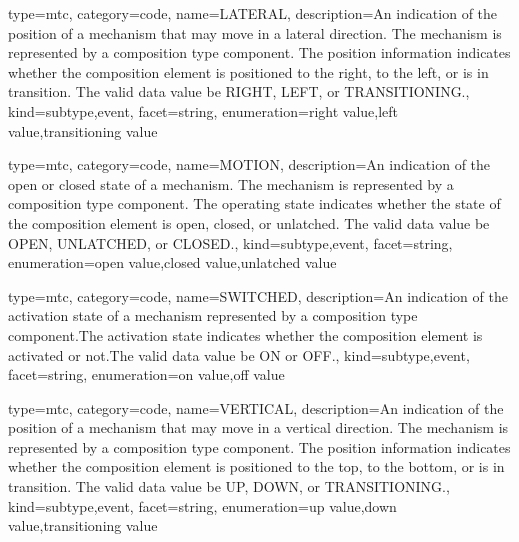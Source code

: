 {
  type=mtc,
  category=code,
  name={LATERAL},
  description={An indication of the position of a mechanism that may move in a lateral direction.   The mechanism is represented by a \gls{composition} type component. \newline The position information indicates whether the \gls{composition} element is positioned to the right, to the left, or is in transition.  \newline The \gls{valid data value} \must be RIGHT, LEFT, or TRANSITIONING.},
  kind={subtype,event},
  facet={\gls{string}},
  enumeration={\gls{right value},\gls{left value},\gls{transitioning value}}
}


{
  type=mtc,
  category=code,
  name={MOTION},
  description={An indication of the open or closed state of a mechanism.   The mechanism is represented by a \gls{composition} type component. \newline The operating state indicates whether the state of the \gls{composition} element is open, closed, or unlatched.   \newline The \gls{valid data value} \must be OPEN, UNLATCHED, or CLOSED.},
  kind={subtype,event},
  facet={\gls{string}},
  enumeration={\gls{open value},\gls{closed value},\gls{unlatched value}}
}


{
  type=mtc,
  category=code,
  name={SWITCHED},
  description={An indication of the activation state of a mechanism represented by a \gls{composition} type component.The activation state indicates whether the \gls{composition} element is activated or not.The \gls{valid data value} \must be ON or OFF.},
  kind={subtype,event},
  facet={\gls{string}},
  enumeration={\gls{on value},\gls{off value}}
}


{
  type=mtc,
  category=code,
  name={VERTICAL},
  description={An indication of the position of a mechanism that may move in a vertical direction. The mechanism is represented by a \gls{composition} type component. \newline The position information indicates whether the \gls{composition} element is positioned to the top, to the bottom, or is in transition.  \newline The \gls{valid data value} \must be UP, DOWN, or TRANSITIONING.},
  kind={subtype,event},
  facet={\gls{string}},
  enumeration={\gls{up value},\gls{down value},\gls{transitioning value}}
}



